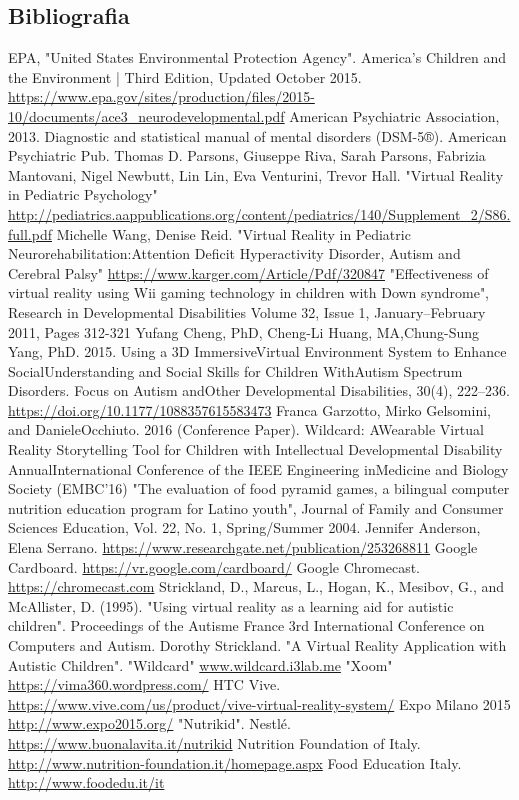 \subsection{Bibliografia} \label{subsec:biblio}
\renewcommand\refname{}
\begin{thebibliography}{100}
 EPA, "United States Environmental Protection Agency". America's Children and the Environment | Third Edition, Updated October 2015. 
\url{https://www.epa.gov/sites/production/files/2015-10/documents/ace3_neurodevelopmental.pdf}
 American Psychiatric Association, 2013. Diagnostic and statistical manual of mental disorders (DSM-5®). American Psychiatric Pub. 
 Thomas D. Parsons, Giuseppe Riva, Sarah Parsons, Fabrizia Mantovani, Nigel Newbutt, Lin Lin, Eva Venturini, Trevor Hall. "Virtual Reality in Pediatric Psychology"
\url{http://pediatrics.aappublications.org/content/pediatrics/140/Supplement_2/S86.full.pdf}
 Michelle Wang, Denise Reid. "Virtual Reality in Pediatric Neurorehabilitation:Attention Deficit Hyperactivity Disorder, Autism and Cerebral Palsy"
\url{https://www.karger.com/Article/Pdf/320847} 
 "Effectiveness of virtual reality using Wii gaming technology in children with Down syndrome", Research in Developmental Disabilities Volume 32, Issue 1, January–February 2011, Pages 312-321
 Yufang Cheng, PhD, Cheng-Li Huang, MA,Chung-Sung Yang, PhD. 2015. Using a 3D ImmersiveVirtual Environment System to Enhance SocialUnderstanding and Social Skills for Children WithAutism Spectrum Disorders. Focus on Autism andOther Developmental Disabilities, 30(4), 222–236.
\url{https://doi.org/10.1177/1088357615583473}
Franca Garzotto, Mirko Gelsomini, and DanieleOcchiuto. 2016 (Conference Paper). Wildcard: AWearable Virtual Reality Storytelling Tool for Children with Intellectual Developmental Disability AnnualInternational Conference of the IEEE Engineering inMedicine and Biology Society (EMBC’16)
"The evaluation of food pyramid games, a bilingual computer nutrition education program
for Latino youth", Journal of Family and Consumer Sciences Education, Vol. 22, No. 1, Spring/Summer 2004. Jennifer Anderson, Elena Serrano.
\url{https://www.researchgate.net/publication/253268811}
 Google Cardboard. 
\url{https://vr.google.com/cardboard/}
 Google Chromecast.
\url{https://chromecast.com}
Strickland, D., Marcus, L., Hogan, K., Mesibov, G., and McAllister, D. (1995). "Using virtual reality as a learning aid for autistic children". Proceedings of the Autisme France 3rd International Conference on Computers and Autism.
Dorothy Strickland. "A Virtual Reality Application with Autistic Children".
"Wildcard"
\url{www.wildcard.i3lab.me}
"Xoom"
\url{https://vima360.wordpress.com/}
 HTC Vive.
\url{https://www.vive.com/us/product/vive-virtual-reality-system/}
 Expo Milano 2015
\url{http://www.expo2015.org/}
 "Nutrikid". Nestlé.
\url{https://www.buonalavita.it/nutrikid}
 Nutrition Foundation of Italy.
\url{http://www.nutrition-foundation.it/homepage.aspx}
 Food Education Italy.
\url{http://www.foodedu.it/it}

\end{thebibliography}